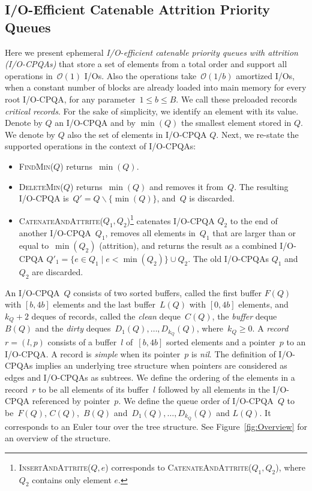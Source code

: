 \documentclass{sig-alternate}
\newcommand{\bigO}{\mathcal{O}}
\newcommand{\nil}{\textit{nil}}
\renewcommand{\(}{\left(}
\renewcommand{\)}{\right)}
\begin{document}
\subsection{I/O-Efficient Catenable Attrition Priority Queues}
\label{sec:iocpqa}


Here we present ephemeral \emph{I/O-efficient catenable priority queues with
attrition (I/O-CPQAs)} that store a set of elements from a total order and
support all operations in~$\bigO(1)$ I/Os. Also the operations take~$\bigO(1/b)$
amortized I/Os, when a constant number of blocks are already loaded into main
memory for every root I/O-CPQA, for any parameter~$1 \leq b \leq B$. We call
these preloaded records \emph{critical records}. For the sake of simplicity, we
identify an element with its value. Denote by $Q$ an I/O-CPQA and by $\min(Q)$
the smallest element stored in $Q$. We denote by $Q$ also the set of elements in
I/O-CPQA $Q$. Next, we re-state the supported operations in the context of
I/O-CPQAs:

\begin{itemize}
  \item \textsc{FindMin}($Q$) returns~$\min(Q)$.
\vspace{-2mm}
  \item \textsc{DeleteMin}($Q$) returns~$\min(Q)$ and removes it from~$Q$. The
  resulting I/O-CPQA is~$Q' = Q \backslash\{\min(Q)\}$, and~$Q$ is discarded.
\vspace{-2mm}
  \item \textsc{CatenateAndAttrite}($Q_1,Q_2$)\footnote{
    \textsc{InsertAndAttrite}($Q,e$) corresponds to
  \textsc{CatenateAndAttrite}($Q_1,Q_2$), where $Q_2$ contains only element
  $e$.} catenates I/O-CPQA $Q_2$ to the end of another I/O-CPQA~$Q_1$,
  removes all elements in~$Q_1$ that are larger than or equal to~$\min(Q_2)$
  (attrition), and returns the result as a combined I/O-CPQA $Q'_1 = \{e \in
  Q_1 \mid e < \min(Q_2)\} \cup Q_2$. The old I/O-CPQAs $Q_1$ and $Q_2$ are
  discarded.
\end{itemize}

An I/O-CPQA~$Q$ consists of two sorted buffers, called the first buffer $F(Q)$
with $[b,4b]$ elements and the last buffer~$L(Q)$ with $[0,4b]$ elements,
and~$k_Q+2$ deques of records, called the \emph{clean} deque~$C(Q)$, the
\emph{buffer} deque~$B(Q)$ and the \emph{dirty}
deques~$D_1(Q),\ldots,D_{k_Q}(Q)$, where~$k_Q \geq 0$. A \emph{record}~$r =
(l,p)$ consists of a buffer~$l$ of~$[b,4b]$ sorted elements and a pointer~$p$ to
an I/O-CPQA. A record is \emph{simple} when its pointer~$p$ is \nil. The
definition of I/O-CPQAs implies an underlying tree structure when pointers are
considered as edges and I/O-CPQAs as subtrees. We define the ordering of the
elements in a record~$r$ to be all elements of its buffer~$l$ followed by all
elements in the I/O-CPQA referenced by pointer~$p$. We define the queue order of
I/O-CPQA~$Q$ to be~$F(Q)$, $C(Q)$,~$B(Q)$ and~$D_1(Q),\ldots,D_{k_Q}(Q)$ and
$L(Q)$. It corresponds to an Euler tour over the tree structure. See
Figure~\ref{fig:Overview} for an overview of the structure.
\end{document}
